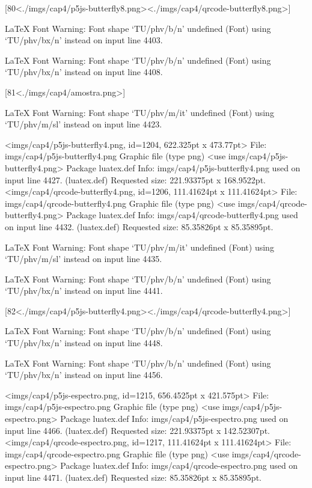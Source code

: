 [80<./imgs/cap4/p5js-butterfly8.png><./imgs/cap4/qrcode-butterfly8.png>]

LaTeX Font Warning: Font shape `TU/phv/b/n' undefined
(Font)              using `TU/phv/bx/n' instead on input line 4403.


LaTeX Font Warning: Font shape `TU/phv/b/n' undefined
(Font)              using `TU/phv/bx/n' instead on input line 4408.

[81<./imgs/cap4/amostra.png>]

LaTeX Font Warning: Font shape `TU/phv/m/it' undefined
(Font)              using `TU/phv/m/sl' instead on input line 4423.

<imgs/cap4/p5js-butterfly4.png, id=1204, 622.325pt x 473.77pt>
File: imgs/cap4/p5js-butterfly4.png Graphic file (type png)
<use imgs/cap4/p5js-butterfly4.png>
Package luatex.def Info: imgs/cap4/p5js-butterfly4.png  used on input line 4427.
(luatex.def)             Requested size: 221.93375pt x 168.9522pt.
<imgs/cap4/qrcode-butterfly4.png, id=1206, 111.41624pt x 111.41624pt>
File: imgs/cap4/qrcode-butterfly4.png Graphic file (type png)
<use imgs/cap4/qrcode-butterfly4.png>
Package luatex.def Info: imgs/cap4/qrcode-butterfly4.png  used on input line 4432.
(luatex.def)             Requested size: 85.35826pt x 85.35895pt.

LaTeX Font Warning: Font shape `TU/phv/m/it' undefined
(Font)              using `TU/phv/m/sl' instead on input line 4435.


LaTeX Font Warning: Font shape `TU/phv/b/n' undefined
(Font)              using `TU/phv/bx/n' instead on input line 4441.

[82<./imgs/cap4/p5js-butterfly4.png><./imgs/cap4/qrcode-butterfly4.png>]

LaTeX Font Warning: Font shape `TU/phv/b/n' undefined
(Font)              using `TU/phv/bx/n' instead on input line 4448.


LaTeX Font Warning: Font shape `TU/phv/b/n' undefined
(Font)              using `TU/phv/bx/n' instead on input line 4456.

<imgs/cap4/p5js-espectro.png, id=1215, 656.4525pt x 421.575pt>
File: imgs/cap4/p5js-espectro.png Graphic file (type png)
<use imgs/cap4/p5js-espectro.png>
Package luatex.def Info: imgs/cap4/p5js-espectro.png  used on input line 4466.
(luatex.def)             Requested size: 221.93375pt x 142.52307pt.
<imgs/cap4/qrcode-espectro.png, id=1217, 111.41624pt x 111.41624pt>
File: imgs/cap4/qrcode-espectro.png Graphic file (type png)
<use imgs/cap4/qrcode-espectro.png>
Package luatex.def Info: imgs/cap4/qrcode-espectro.png  used on input line 4471.
(luatex.def)             Requested size: 85.35826pt x 85.35895pt.

